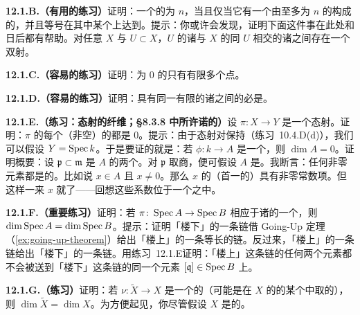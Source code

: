 \textbf{12.1.B.（有用的练习）}\quad 证明：一个\trScheme{}的\trDimension{}为 $n$，当且仅当它有一个由\trDimension{}至多为 $n$ 的\trAffine\trOpenSubset{}构成的\trOpenCover，并且等号在其中某个\trAffine\trOpenSubset{}上达到。提示：你或许会发现，证明下面这件事在此处和日后都有帮助。对任意\trTopologicalSpace{} $X$ 与\trOpenSubset{} $U\subset X$，$U$ 的诸\trIrreducible{}\trClosedSubset{}与 $X$ 的同 $U$ 相交的诸\trIrreducible{}\trClosedSubset{}之间存在一个双射。

\textbf{12.1.C.（容易的练习）}\quad 证明：\trDimension{}为 $0$ 的\trNoetherian\trScheme{}只有有限多个点。

\textbf{12.1.D.（容易的练习）}\quad 证明：具有同一有限\trDimension{}的诸\trIntegralDomain{}之间的\trSurjectiveMap{}必是\trIsomorphism。

\textbf{12.1.E.（练习：\trIntegral{}态射的纤维；\S8.3.8 中所许诺的）}\quad 设 $\pi\colon X\to Y$ 是一个\trIntegral{}态射。证明：$\pi$ 的每个（非空）\trFiber{}的\trDimension{}都是 $0$。提示：由于\trIntegral{}态射对\trBaseChange{}保持（\mbox{练习~10.4.D(d)}），我们可以假设 $Y=\operatorname{Spec} k$。于是要证的就是：若 $\phi\colon k\to A$ 是一个\trIntegralExtension，则 $\dim A=0$。证明概要：设 $\mathfrak{p}\subset\mathfrak{m}$ 是 $A$ 的两个\trPrimeIdeal。对 $\mathfrak{p}$ 取商，便可假设 $A$ 是\trIntegralDomain。我断言：任何非零元素都是\trInvertible{}的。比如说 $x\in A$ 且 $x\neq0$。那么 $x$ 的\trMinimalPolynomial（首一的）具有非零常数项。但这样一来 $x$ 就\trInvertible{}了——回想这些系数位于一个\trField{}之中。

\textbf{12.1.F.（重要练习）}\quad 证明：若 $\pi\colon\operatorname{Spec} A\to\operatorname{Spec} B$ 相应于诸\trRing{}的一个\trIntegralExtension，则 $\dim\operatorname{Spec} A=\dim\operatorname{Spec} B$。提示：证明「楼下」的一条\trPrimeIdeal{}链借 Going-Up 定理（\cref{ex:going-up-theorem}）给出「楼上」的一条等长的链。反过来，「楼上」的一条链给出「楼下」的一条链。用\mbox{练习~12.1.E}证明：「楼上」这条链的任何两个元素都不会被送到「楼下」这条链的同一个元素 $[\mathfrak{q}]\in\operatorname{Spec} B$ 上。

\textbf{12.1.G.（练习）}\quad 证明：若 $\nu\colon\widetilde{X}\to X$ 是一个\trScheme{}的\trNormalization（可能是在 $X$ 的\trFunctionField{}的某个\trFiniteFieldExtension{}中取的），则 $\dim\widetilde{X}=\dim X$。为方便起见，你尽管假设 $X$ 是\trIntegral{}的。

